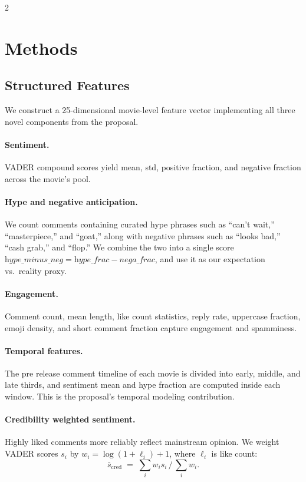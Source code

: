 \documentclass[10pt,letterpaper]{article}
\begin{document}
\begin{multicols}{2}
\section{Methods}

\subsection{Structured Features}
\noindent We construct a 25-dimensional movie-level feature vector implementing all three novel components from the proposal.

\paragraph{Sentiment.} VADER \cite{hutto2014} compound scores yield mean, std, positive fraction, and negative fraction across the movie's pool.

\paragraph{Hype and negative anticipation.} We count comments containing curated hype phrases such as ``can't wait,'' ``masterpiece,'' and ``goat,'' along with negative phrases such as ``looks bad,'' ``cash grab,'' and ``flop.'' We combine the two into a single score $\textit{hype\_minus\_neg} = \textit{hype\_frac} - \textit{nega\_frac}$, and use it as our expectation vs.\ reality proxy.

\paragraph{Engagement.} Comment count, mean length, like count statistics, reply rate, uppercase fraction, emoji density, and short comment fraction capture engagement and spamminess.

\paragraph{Temporal features.} The pre release comment timeline of each movie is divided into early, middle, and late thirds, and sentiment mean and hype fraction are computed inside each window. This is the proposal's temporal modeling contribution.

\paragraph{Credibility weighted sentiment.} Highly liked comments more reliably reflect mainstream opinion. We weight VADER scores $s_i$ by $w_i = \log(1 + \ell_i) + 1$, where $\ell_i$ is like count:
\[
\bar{s}_{\text{cred}} \;=\; \sum_i w_i s_i \,\Big/\, \sum_i w_i.
\]


\end{multicols}
\end{document}
